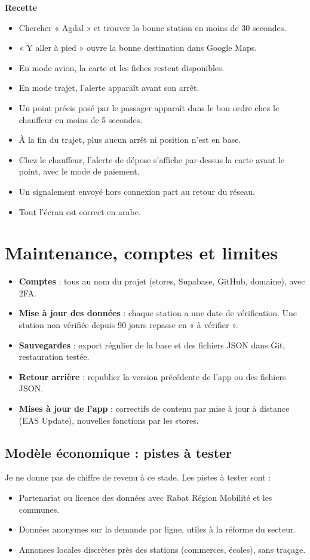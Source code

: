 \documentclass[11pt,a4paper]{article}
\begin{document}
\textbf{Recette}
\begin{itemize}[label=$\square$]
\item Chercher « Agdal » et trouver la bonne station en moins de 30 secondes.
\item « Y aller à pied » ouvre la bonne destination dans Google Maps.
\item En mode avion, la carte et les fiches restent disponibles.
\item En mode trajet, l'alerte apparaît avant son arrêt.
\item Un point précis posé par le passager apparaît dans le bon ordre chez le chauffeur en moins de 5 secondes.
\item À la fin du trajet, plus aucun arrêt ni position n'est en base.
\item Chez le chauffeur, l'alerte de dépose s'affiche par-dessus la carte avant le point, avec le mode de paiement.
\item Un signalement envoyé hors connexion part au retour du réseau.
\item Tout l'écran est correct en arabe.
\end{itemize}

\Needspace{7cm}
\section{Maintenance, comptes et limites}
\begin{itemize}
\item \textbf{Comptes} : tous au nom du projet (stores, Supabase, GitHub, domaine), avec 2FA.
\item \textbf{Mise à jour des données} : chaque station a une date de vérification. Une station non vérifiée depuis 90 jours repasse en « à vérifier ».
\item \textbf{Sauvegardes} : export régulier de la base et des fichiers JSON dans Git, restauration testée.
\item \textbf{Retour arrière} : republier la version précédente de l'app ou des fichiers JSON.
\item \textbf{Mises à jour de l'app} : correctifs de contenu par mise à jour à distance (EAS Update), nouvelles fonctions par les stores.
\end{itemize}

\subsection{Modèle économique : pistes à tester}
Je ne donne pas de chiffre de revenu à ce stade. Les pistes à tester sont :
\begin{itemize}
\item Partenariat ou licence des données avec Rabat Région Mobilité et les communes.
\item Données anonymes sur la demande par ligne, utiles à la réforme du secteur.
\item Annonces locales discrètes près des stations (commerces, écoles), sans traçage.
\end{itemize}
\end{document}
